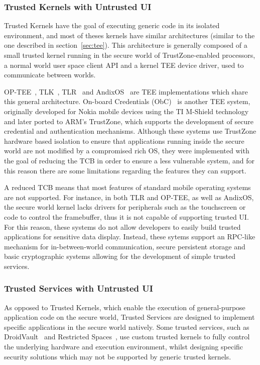\subsubsection{Trusted Kernels with Untrusted UI}

Trusted Kernels have the goal of executing generic code in its isolated environment, and most of theses kernels have similar architectures (similar to the one described in section~\ref{sec:tee}). This architecture is generally composed of a small trusted kernel running in the secure world of TrustZone-enabled processors, a normal world user space client API and a kernel TEE device driver, used to communicate between worlds.

OP-TEE~\cite{op_tee}, TLK~\cite{tlk}, TLR~\cite{santos2011trusted} and AndixOS~\cite{fitzekandix} are \ac{TEE} implementations which share this general architecture. On-board Credentials (ObC)~\cite{kostiainen2012board} is another \ac{TEE} system, originally developed for Nokia mobile devices using the TI M-Shield technology and later ported to ARM's TrustZone, which supports the development of secure credential and authentication mechanisms. Although these systems use TrustZone hardware based isolation to ensure that applications running inside the secure world are not modified by a compromised rich OS, they were implemented with the goal of reducing the \ac{TCB} in order to ensure a less vulnerable system, and for this reason there are some limitations regarding the features they can support.

A reduced \ac{TCB} means that most features of standard mobile operating systems are not supported. For instance, in both TLR and OP-TEE, as well as AndixOS, the secure world kernel lacks drivers for peripherals such as the touchscreen or code to control the framebuffer, thus it is not capable of supporting trusted UI. For this reason, these systems do not allow developers to easily build trusted applications for sensitive data display. Instead, these sytems support an RPC-like mechanism for in-between-world communication, secure persistent storage and basic cryptographic systems allowing for the development of simple trusted services.

\subsubsection{Trusted Services with Untrusted UI}

As opposed to Trusted Kernels, which enable the execution of general-purpose application code on the secure world, Trusted Services are designed to implement specific applications in the secure world natively. Some trusted services, such as DroidVault~\cite{li2014droidvault} and Restricted Spaces~\cite{brasserregulating}, use custom trusted kernels to fully control the underlying hardware and execution environment, whilst designing specific security solutions which may not be supported by generic trusted kernels.

